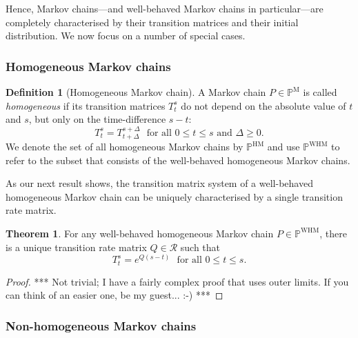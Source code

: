 \documentclass[10pt]{paper}
\theoremstyle{definition}
\newtheorem{theorem}{Theorem}
\newtheorem{definition}{Definition}
\newcommand{\reals}{\mathbb{R}}
\newcommand{\realspos}{\reals_{>0}}
\newcommand{\realsnonneg}{\reals_{\geq 0}}
\newcommand{\processes}{\mathbb{P}}
\newcommand{\mprocesses}{\processes^{\mathrm{M}}}
\newcommand{\hmprocesses}{\processes^{\mathrm{HM}}}
\newcommand{\whmprocesses}{\processes^{\mathrm{WHM}}}
\newcommand{\norm}[1]{\left\lVert #1 \right\rVert}
\begin{document}
Hence, Markov chains---and well-behaved Markov chains in particular---are completely characterised by their transition matrices and their initial distribution. 
We now focus on a number of special cases.

\subsubsection{Homogeneous Markov chains}

\begin{definition}[Homogeneous Markov chain]\label{def:markov_property}
A Markov chain $P\in\mprocesses$ is called \emph{homogeneous} if its transition matrices $T_t^s$ do not depend on the absolute value of $t$ and $s$, but only on the time-difference $s-t$:
\begin{equation*}
T_t^s=T_{t+\Delta}^{s+\Delta}
\text{~~for all $0\leq t\leq s$ and $\Delta\geq0$.}
\end{equation*}
We denote the set of all homogeneous Markov chains by $\hmprocesses$ and use $\whmprocesses$ to refer to the subset that consists of the well-behaved homogeneous Markov chains.
\end{definition}

As our next result shows, the transition matrix system of a well-behaved homogeneous Markov chain can be uniquely characterised by a single transition rate matrix.

\begin{theorem}
For any well-behaved homogeneous Markov chain $P\in\whmprocesses$, there is a unique transition rate matrix $Q\in\mathcal{R}$ such that
\begin{equation*}
T_t^s=e^{Q(s-t)}
\text{~~for all $0\leq t\leq s$.}
\end{equation*}
\end{theorem}
\begin{proof}
*** Not trivial; I have a fairly complex proof that uses outer limits. If you can think of an easier one, be my guest... :-) ***
\end{proof}





\subsubsection{Non-homogeneous Markov chains}


\end{document}
